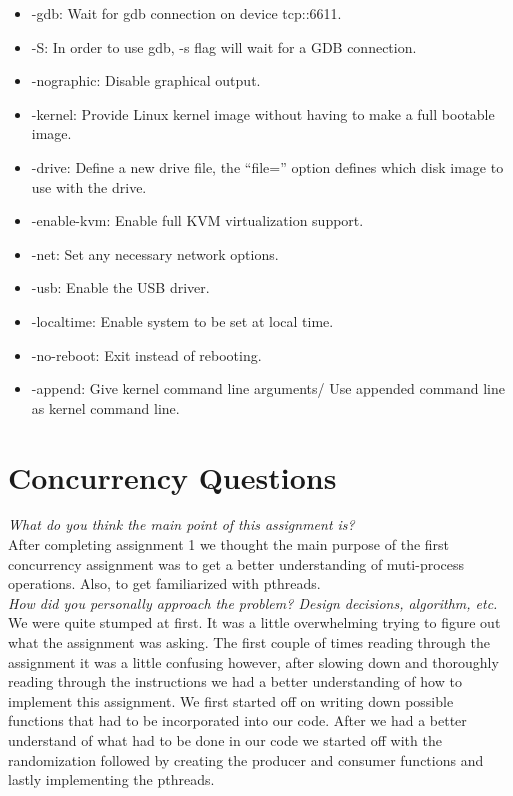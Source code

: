 \documentclass[letterpaper,10pt,titlepage]{article}
\begin{document}
\begin{itemize}
  \item -gdb: Wait for gdb connection on device tcp::6611.
  \item -S: In order to use gdb, -s flag will wait for a GDB connection.
  \item -nographic: Disable graphical output.
  \item -kernel: Provide Linux kernel image without having to make a full bootable image.
  \item -drive: Define a new drive file, the “file=” option defines which disk image to use with the drive.
  \item -enable-kvm: Enable full KVM virtualization support.
  \item -net: Set any necessary network options.
  \item -usb: Enable the USB driver.
  \item -localtime: Enable system to be set at local time.
  \item -no-reboot: Exit instead of rebooting.
  \item -append: Give kernel command line arguments/ Use appended command line as kernel command line.

\end{itemize}

\section{Concurrency Questions}

\textit{What do you think the main point of this assignment is?}\\

After completing assignment 1 we thought the main purpose of the first concurrency assignment was to get a better understanding of muti-process operations. Also, to get familiarized with pthreads.\\

\textit{How did you personally approach the problem? Design decisions, algorithm, etc.}\\

We were quite stumped at first. It was a little overwhelming trying to figure out what the assignment was asking. The first couple of times reading through the assignment it was a little confusing however, after slowing down and thoroughly reading through the instructions we had a better understanding of how to implement this assignment. We first started off on writing down possible functions that had to be incorporated into our code. After we had a better understand of what had to be done in our code we started off with the randomization followed by creating the producer and consumer functions and lastly implementing the pthreads.\\
\end{document}
